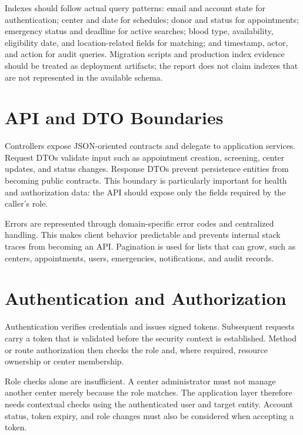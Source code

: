 Indexes should follow actual query patterns: email and account state for authentication; center and date for schedules; donor and status for appointments; emergency status and deadline for active searches; blood type, availability, eligibility date, and location-related fields for matching; and timestamp, actor, and action for audit queries. Migration scripts and production index evidence should be treated as deployment artifacts; the report does not claim indexes that are not represented in the available schema.

\section{API and DTO Boundaries}
Controllers expose JSON-oriented contracts and delegate to application services. Request DTOs validate input such as appointment creation, screening, center updates, and status changes. Response DTOs prevent persistence entities from becoming public contracts. This boundary is particularly important for health and authorization data: the API should expose only the fields required by the caller's role.

Errors are represented through domain-specific error codes and centralized handling. This makes client behavior predictable and prevents internal stack traces from becoming an API. Pagination is used for lists that can grow, such as centers, appointments, users, emergencies, notifications, and audit records.

\section{Authentication and Authorization}
Authentication verifies credentials and issues signed tokens. Subsequent requests carry a token that is validated before the security context is established. Method or route authorization then checks the role and, where required, resource ownership or center membership.


Role checks alone are insufficient. A center administrator must not manage another center merely because the role matches. The application layer therefore needs contextual checks using the authenticated user and target entity. Account status, token expiry, and role changes must also be considered when accepting a token.


